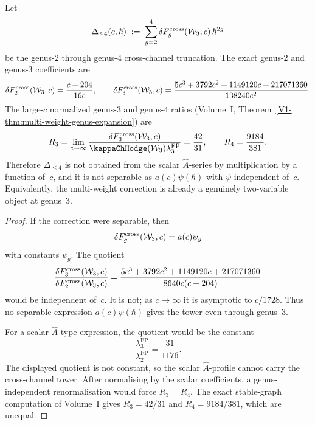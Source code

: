 \begin{proposition}
\label{prop:cross-channel-truncated-no-closed-form}
Let
\[
\Delta_{\leq 4}(c,\hbar)
\;:=\;
\sum_{g=2}^{4}
\delta F_g^{\mathrm{cross}}(\mathcal{W}_3,c)\,\hbar^{2g}
\]
be the genus-$2$ through genus-$4$ cross-channel truncation. The
exact genus-$2$ and genus-$3$ coefficients are
\[
\delta F_2^{\mathrm{cross}}(\mathcal{W}_3,c)
=\frac{c+204}{16c},
\qquad
\delta F_3^{\mathrm{cross}}(\mathcal{W}_3,c)
=
\frac{5c^3+3792c^2+1149120c+217071360}{138240c^2}.
\]
The large-$c$ normalized genus-$3$ and genus-$4$ ratios
\textup{(}Volume~I, Theorem~\textup{\ref*{V1-thm:multi-weight-genus-expansion}}\textup{)}
are
\[
R_3=\lim_{c\to\infty}
\frac{\delta F_3^{\mathrm{cross}}(\cW_3,c)}
{\kappaChHodge(\cW_3)\lambda_3^{\mathrm{FP}}}
=\frac{42}{31},
\qquad
R_4=\frac{9184}{381}.
\]
Therefore $\Delta_{\leq 4}$ is not obtained from the scalar
$\hat A$-series by multiplication by a function of~$c$, and it is not
separable as $a(c)\psi(\hbar)$ with $\psi$ independent of~$c$.
Equivalently, the multi-weight correction is already a genuinely
two-variable object at genus~$3$.
\end{proposition}

\begin{proof}
If the correction were separable, then
\[
\delta F_g^{\mathrm{cross}}(\mathcal{W}_3,c)=a(c)\psi_g
\]
with constants $\psi_g$. The quotient
\[
\frac{\delta F_3^{\mathrm{cross}}(\mathcal{W}_3,c)}
{\delta F_2^{\mathrm{cross}}(\mathcal{W}_3,c)}
=
\frac{5c^3+3792c^2+1149120c+217071360}{8640c(c+204)}
\]
would be independent of~$c$. It is not; as $c\to\infty$ it is
asymptotic to $c/1728$. Thus no separable expression
$a(c)\psi(\hbar)$ gives the tower even through genus~$3$.

For a scalar $\hat A$-type expression, the quotient would be the
constant
\[
\frac{\lambda_3^{\mathrm{FP}}}{\lambda_2^{\mathrm{FP}}}
=\frac{31}{1176}.
\]
The displayed quotient is not constant, so the scalar
$\hat A$-profile cannot carry the cross-channel tower. After
normalising by the scalar coefficients, a genus-independent
renormalisation would force $R_3=R_4$. The exact stable-graph
computation of Volume~I gives $R_3=42/31$ and $R_4=9184/381$,
which are unequal.
\end{proof}


